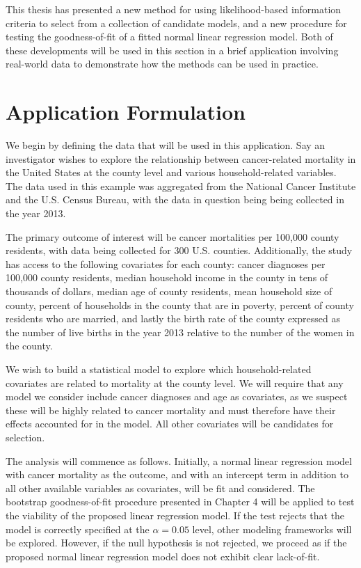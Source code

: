 \doublespace
{}

		This thesis has presented a new method for using likelihood-based information criteria to select from a collection of candidate models, and a new procedure
		for testing the goodness-of-fit of a fitted normal linear regression model. Both of these developments will be used in this section in a brief application
		involving real-world data to demonstrate how the methods can be used in practice.

		\section{Application Formulation} \label{sec:app_form}

		We begin by defining the data that will be used in this application. Say an investigator wishes to explore the relationship between cancer-related mortality in
		the United States at the county level and various household-related variables. The data used in this example was aggregated from the National Cancer Institute
		and the U.S. Census Bureau, with the data in question being being collected in the year 2013.
		
		The primary outcome of interest will be cancer mortalities per 100,000 county residents, with data being collected for 300 U.S. counties. Additionally, the study has access to the
		following covariates for each county: cancer diagnoses per 100,000 county residents, median household income in the county in tens of thousands of dollars, median age of county residents, mean
		household size of county, percent of households in the county that are in poverty, percent of county residents who are married, and lastly the birth rate of the county expressed
		as the number of live births in the year 2013 relative to the number of the women in the county.

		We wish to build a statistical model to explore which household-related covariates are related to mortality at the county level. We will require that any model we
		consider include cancer diagnoses and age as covariates, as we suspect these will be highly related to cancer mortality and must therefore have their effects
		accounted for in the model. All other covariates will be candidates for selection.

		The analysis will commence as follows. Initially, a normal linear regression model with cancer mortality as the outcome, and with an intercept term in addition to all
		other available variables as covariates, will be fit and considered. The bootstrap goodness-of-fit procedure presented in Chapter 4 will be applied to test the 
		viability of the proposed linear regression model. If the test rejects that the model is correctly specified at the $\alpha = 0.05$ level, other modeling frameworks
		will be explored. However, if the null hypothesis is not rejected, we proceed as if the proposed normal linear regression model does not exhibit clear lack-of-fit.

